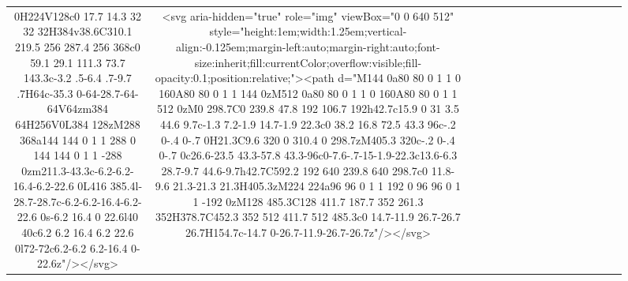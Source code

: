 \documentclass[
]{article}
\begin{document}
\begin{figure*}
\begin{longtable*}{cclllccccccccccl}
0H224V128c0 17.7 14.3 32 32 32H384v38.6C310.1 219.5 256 287.4 256 368c0 59.1 29.1 111.3 73.7 143.3c-3.2 .5-6.4 .7-9.7 .7H64c-35.3 0-64-28.7-64-64V64zm384 64H256V0L384 128zM288 368a144 144 0 1 1 288 0 144 144 0 1 1 -288 0zm211.3-43.3c-6.2-6.2-16.4-6.2-22.6 0L416 385.4l-28.7-28.7c-6.2-6.2-16.4-6.2-22.6 0s-6.2 16.4 0 22.6l40 40c6.2 6.2 16.4 6.2 22.6 0l72-72c6.2-6.2 6.2-16.4 0-22.6z"/></svg> & <svg aria-hidden="true" role="img" viewBox="0 0 640 512" style="height:1em;width:1.25em;vertical-align:-0.125em;margin-left:auto;margin-right:auto;font-size:inherit;fill:currentColor;overflow:visible;fill-opacity:0.1;position:relative;"><path d="M144 0a80 80 0 1 1 0 160A80 80 0 1 1 144 0zM512 0a80 80 0 1 1 0 160A80 80 0 1 1 512 0zM0 298.7C0 239.8 47.8 192 106.7 192h42.7c15.9 0 31 3.5 44.6 9.7c-1.3 7.2-1.9 14.7-1.9 22.3c0 38.2 16.8 72.5 43.3 96c-.2 0-.4 0-.7 0H21.3C9.6 320 0 310.4 0 298.7zM405.3 320c-.2 0-.4 0-.7 0c26.6-23.5 43.3-57.8 43.3-96c0-7.6-.7-15-1.9-22.3c13.6-6.3 28.7-9.7 44.6-9.7h42.7C592.2 192 640 239.8 640 298.7c0 11.8-9.6 21.3-21.3 21.3H405.3zM224 224a96 96 0 1 1 192 0 96 96 0 1 1 -192 0zM128 485.3C128 411.7 187.7 352 261.3 352H378.7C452.3 352 512 411.7 512 485.3c0 14.7-11.9 26.7-26.7 26.7H154.7c-14.7 0-26.7-11.9-26.7-26.7z"/></svg> &  \\ 

\end{longtable*}
\end{figure*}
\end{document}
